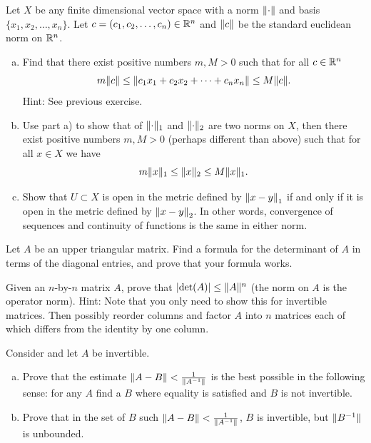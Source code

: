 \begin{samepage}
\begin{exercise} \label{exercise:allnormsequiv}
Let $X$ be any finite dimensional vector space with a norm $\lVert {\cdot} \rVert$
and basis $\{ x_1,x_2,\ldots,x_n
\}$.  Let $c = (c_1,c_2,\ldots,c_n) \in {\mathbb{R}}^n$ and $\lVert {c} \rVert$ be the
standard euclidean norm on ${\mathbb{R}}^n$.
\begin{enumerate}[a)]
\item
Find that there exist positive numbers $m,M > 0$ such that
for all $c \in {\mathbb{R}}^n$
\begin{equation*}
m \lVert {c} \rVert
\leq
\lVert {c_1 x_1 + c_2 x_2 + \cdots + c_n x_n} \rVert
\leq
M \lVert {c} \rVert .
\end{equation*}
Hint: See previous exercise.
\item
Use part a) to show that of
$\lVert {\cdot} \rVert_1$ and
$\lVert {\cdot} \rVert_2$ are two norms on $X$, then there exist positive
numbers $m,M > 0$ (perhaps different than above) such that
for all $x \in X$ we have
\begin{equation*}
m \lVert {x} \rVert_1
\leq
\lVert {x} \rVert_2
\leq
M \lVert {x} \rVert_1 .
\end{equation*}
\item
Show that $U \subset X$ is open in the metric defined by
$\left\lVert {x-y} \right\rVert_1$ if and only if it is open in the metric defined by
$\left\lVert {x-y} \right\rVert_2$.  In other words, convergence of sequences and continuity
of functions is the same in either norm.
\end{enumerate}
\end{exercise}
\end{samepage}

\begin{exercise}
Let $A$ be an upper triangular matrix.  Find a formula for the determinant
of $A$ in terms of the diagonal entries, and prove that your formula works.
\end{exercise}

\begin{exercise}
Given an $n$-by-$n$ matrix $A$, prove that
$\left\lvert {\det(A)} \right\rvert \leq \lVert {A} \rVert^n$ (the norm on $A$ is the operator norm).
Hint: Note that you only need to show this for invertible matrices.  Then
possibly reorder columns and factor $A$ into $n$ matrices each of
which differs from the identity by one column.
\end{exercise}

\begin{exercise}
Consider  and let $A$ be invertible.
\begin{enumerate}[a)]
\item
Prove that the estimate $\lVert {A-B} \rVert < \frac{1}{\lVert {A^{-1}} \rVert}$ is the
best possible in the following sense: for any $A$ find a $B$ where equality is satisfied and $B$ is
not invertible.
\item
Prove that in the set of $B$ such $\lVert {A-B} \rVert < \frac{1}{\lVert {A^{-1}} \rVert}$, $B$ is 
invertible, but $\lVert {B^{-1}} \rVert$ is unbounded.
\end{enumerate}
\end{exercise}

